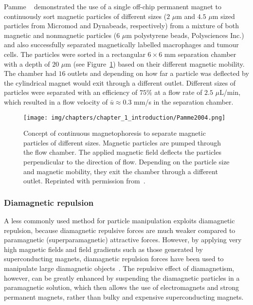 Pamme \etal{}~\cite{Pamme2004,Pamme2006a} demonstrated the use of a single off-chip permanent magnet to continuously sort magnetic particles of different sizes ($2$ $\mu$m and $4.5$ $\mu$m sized particles from Micromod and Dynabeads, respectively) from a mixture of both magnetic and nonmagnetic particles ($6$ $\mu$m polystyrene beads, Polysciences Inc.) and also successfully separated magnetically labelled macrophages and tumour cells. The particles were sorted in a rectangular $6\times6$ mm separation chamber with a depth of $20$ $\mu$m (see Figure~\ref{fig:magneticSortingChamberPamme}) based on their different magnetic mobility. The chamber had $16$ outlets and depending on how far a particle was deflected by the cylindrical magnet would exit through a different outlet. Different sizes of particles were separated with an efficiency of $75\%$ at a flow rate of $2.5$ $\mu$L/min, which resulted in a flow velocity of $\bar{u}\approx0.3$ mm/s in the separation chamber.

\begin{figure}[htb]
        \centering
		\texttt{[image: img/chapters/chapter\_1\_introduction/Pamme2004.png]}
        \caption[Free-flow magnetophoresis in a microfluidic separation chamber to sort different sized magnetic particles]{Concept of continuous magnetophoresis to separate magnetic particles of different sizes. Magnetic particles are pumped through the flow chamber. The applied magnetic field deflects the particles perpendicular to the direction of flow. Depending on the particle size and magnetic mobility, they exit the chamber through a different outlet. Reprinted with permission from~\cite{Pamme2004}.}
        \label{fig:magneticSortingChamberPamme}
\end{figure}

\subsubsection{Diamagnetic repulsion}\label{subsection:diamagneticRepulsion}
A less commonly used method for particle manipulation exploits diamagnetic repulsion, because diamagnetic repulsive forces are much weaker compared to paramagnetic (superparamagnetic) attractive forces. However, by applying very high magnetic fields and field gradients such as those generated by superconducting magnets, diamagnetic repulsion forces have been used to manipulate large diamagnetic objects~\cite{Watarai2004}. The repulsive effect of diamagnetism, however, can be greatly enhanced by suspending the diamagnetic particles in a paramagnetic solution, which then allows the use of electromagnets and strong permanent magnets, rather than bulky and expensive superconducting magnets.

